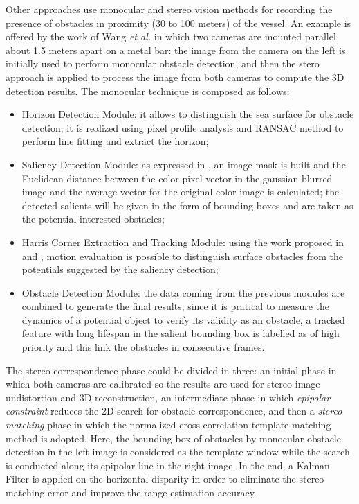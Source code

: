 \documentclass[journal]{IEEEtran}
\begin{document}
      \indent Other approaches use monocular and stereo vision methods for recording the presence of obstacles in proximity (30 to 100 meters) of the vessel. An example is offered by the work of Wang \textit{et al.} \parencite{Wang2011,Wang2012} in which two cameras are mounted parallel about 1.5 meters apart on a metal bar: the image from the camera on the left is initially used to perform monocular obstacle detection, and then the stero approach is applied to process the image from both cameras to compute the 3D detection results. The monocular technique is composed as follows:
            \begin{itemize}
                  \item Horizon Detection Module: it allows to distinguish the sea surface for obstacle detection; it is realized using pixel profile analysis and RANSAC method to perform line fitting and extract the horizon;
                  \item Saliency Detection Module: as expressed in \parencite{Achanta2009}, an image mask is built and the Euclidean distance between the color pixel vector in the gaussian blurred image and the average vector for the original color image is calculated; the detected salients will be given in the form of bounding boxes and are taken as the potential interested obstacles;
                  \item Harris Corner Extraction and Tracking Module: using the work proposed in \parencite{Harris1988} and \parencite{Bouguet1999}, motion evaluation is possible to distinguish surface obstacles from the potentials suggested by the saliency detection;
                  \item Obstacle Detection Module: the data coming from the previous modules are combined to generate the final results; since it is pratical to measure the dynamics of a potential object to verify its validity as an obstacle, a tracked feature with long lifespan in the salient bounding box is labelled as of high priority and this link the obstacles in consecutive frames.
            \end{itemize}
      \indent The stereo correspondence phase could be divided in three: an initial phase in which both cameras are calibrated so the results are used for stereo image undistortion and 3D reconstruction, an intermediate phase in which \textit{epipolar constraint} reduces the 2D search for obstacle correspondence, and then a \textit{stereo matching} phase in which the normalized cross correlation template matching method is adopted. Here, the bounding box of obstacles by monocular obstacle detection in the left image is considered as the template window while the search is conducted along its epipolar line in the right image. In the end, a Kalman Filter is applied on the horizontal disparity in order to eliminate the stereo matching error and improve the range estimation accuracy.
\end{document}
